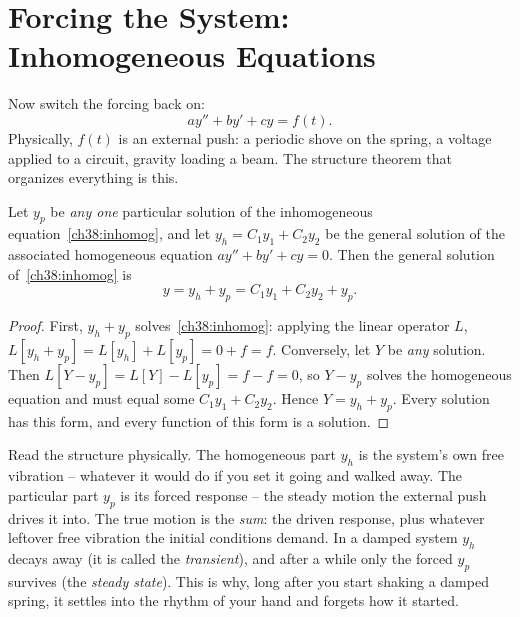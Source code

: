 \section{Forcing the System: Inhomogeneous Equations}
\label{ch38:forcing}

Now switch the forcing back on:
\begin{equation}
  a y'' + b y' + c y = f(t).
  \label{ch38:inhomog}
\end{equation}
Physically, $f(t)$ is an external push: a periodic shove on the spring, a voltage
applied to a circuit, gravity loading a beam. The structure theorem that organizes
everything is this.

\begin{theorem}
\label{ch38:thm-structure}
Let $y_p$ be \emph{any one} particular solution of the inhomogeneous
equation~\eqref{ch38:inhomog}, and let $y_h = C_1 y_1 + C_2 y_2$ be the general
solution of the associated homogeneous equation $a y'' + b y' + c y = 0$. Then
the general solution of~\eqref{ch38:inhomog} is
\[
  y = y_h + y_p = C_1 y_1 + C_2 y_2 + y_p.
\]
\end{theorem}

\begin{proof}
First, $y_h + y_p$ solves~\eqref{ch38:inhomog}: applying the linear operator $L$,
$L[y_h + y_p] = L[y_h] + L[y_p] = 0 + f = f$. Conversely, let $Y$ be \emph{any}
solution. Then $L[Y - y_p] = L[Y] - L[y_p] = f - f = 0$, so $Y - y_p$ solves the
homogeneous equation and must equal some $C_1 y_1 + C_2 y_2$. Hence $Y = y_h +
y_p$. Every solution has this form, and every function of this form is a solution.
\end{proof}

\begin{intuitionbox}
Read the structure physically. The homogeneous part $y_h$ is the system's own
free vibration -- whatever it would do if you set it going and walked away. The
particular part $y_p$ is its forced response -- the steady motion the external
push drives it into. The true motion is the \emph{sum}: the driven response, plus
whatever leftover free vibration the initial conditions demand. In a damped
system $y_h$ decays away (it is called the \emph{transient}), and after a while
only the forced $y_p$ survives (the \emph{steady state}). This is why, long after
you start shaking a damped spring, it settles into the rhythm of your hand and
forgets how it started.
\end{intuitionbox}

